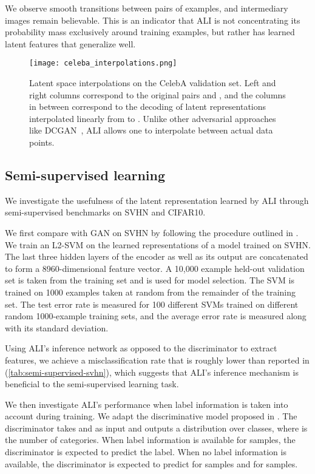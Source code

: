 \documentclass{article}
\begin{document}
We observe smooth transitions between pairs of examples, and intermediary images
remain believable. This is an indicator that ALI is not concentrating its
probability mass exclusively around training examples, but rather has learned
latent features that generalize well.

\begin{figure}[t]
    \centering
    \texttt{[image: celeba\_interpolations.png]}
    \caption{\label{fig:celeba_interpolations} Latent space interpolations on
        the CelebA validation set. Left and right columns correspond to the
        original pairs  and , and the columns in
        between correspond to the decoding of latent representations
        interpolated linearly from  to . Unlike other
        adversarial approaches like DCGAN~\citep{radford2015unsupervised}, ALI
        allows one to interpolate between actual data points.}
\end{figure}

\subsection{Semi-supervised learning}

We investigate the usefulness of the latent representation learned by ALI
through semi-supervised benchmarks on SVHN and CIFAR10.

We first compare with GAN on SVHN by following the procedure outlined in
\citet{radford2015unsupervised}. We train an L2-SVM on the learned
representations of a model trained on SVHN. The last three hidden layers of the
encoder as well as its output are concatenated to form a 8960-dimensional
feature vector. A 10,000 example held-out validation set is taken from the
training set and is used for model selection. The SVM is trained on 1000
examples taken at random from the remainder of the training set. The test error
rate is measured for 100 different SVMs trained on different random 1000-example
training sets, and the average error rate is measured along with its standard
deviation.

Using ALI's inference network as opposed to the discriminator to extract
features, we achieve a misclassification rate that is roughly 
lower than reported in \citet{radford2015unsupervised}
(\autoref{tab:semi-supervised-svhn}), which suggests that ALI's inference
mechanism is beneficial to the semi-supervised learning task.

We then investigate ALI's performance when label information is taken into
account during training. We adapt the discriminative model proposed in
\citet{Salimans2016gan}. The discriminator takes  and  as input and
outputs a distribution over  classes, where  is the number of
categories. When label information is available for  samples, the
discriminator is expected to predict the label. When no label information is
available, the discriminator is expected to predict  for  samples
and  for  samples.
\end{document}

